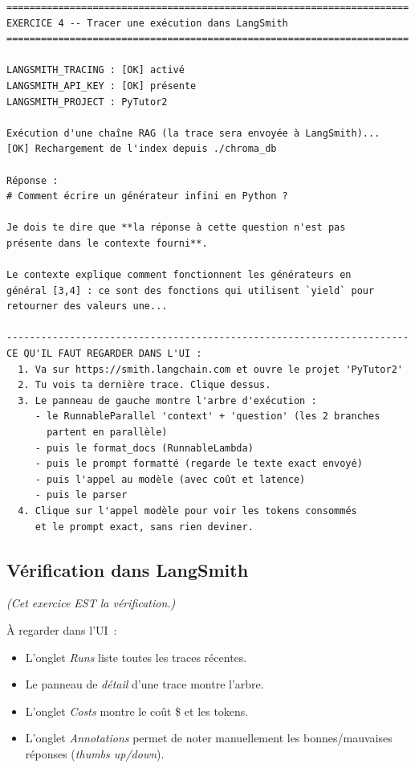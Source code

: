 \documentclass[11pt,a4paper]{article}
\begin{document}
\begin{tcolorbox}[
  colback=white,
  colframe=black!50,
  coltitle=black,
  fonttitle=\footnotesize\bfseries,
  fontupper=\footnotesize,
  title=Sortie de l'exécution,
  breakable,
]
\begin{verbatim}
======================================================================
EXERCICE 4 -- Tracer une exécution dans LangSmith
======================================================================

LANGSMITH_TRACING : [OK] activé
LANGSMITH_API_KEY : [OK] présente
LANGSMITH_PROJECT : PyTutor2

Exécution d'une chaîne RAG (la trace sera envoyée à LangSmith)...
[OK] Rechargement de l'index depuis ./chroma_db

Réponse :
# Comment écrire un générateur infini en Python ?

Je dois te dire que **la réponse à cette question n'est pas
présente dans le contexte fourni**.

Le contexte explique comment fonctionnent les générateurs en
général [3,4] : ce sont des fonctions qui utilisent `yield` pour
retourner des valeurs une...

----------------------------------------------------------------------
CE QU'IL FAUT REGARDER DANS L'UI :
  1. Va sur https://smith.langchain.com et ouvre le projet 'PyTutor2'
  2. Tu vois ta dernière trace. Clique dessus.
  3. Le panneau de gauche montre l'arbre d'exécution :
     - le RunnableParallel 'context' + 'question' (les 2 branches
       partent en parallèle)
     - puis le format_docs (RunnableLambda)
     - puis le prompt formatté (regarde le texte exact envoyé)
     - puis l'appel au modèle (avec coût et latence)
     - puis le parser
  4. Clique sur l'appel modèle pour voir les tokens consommés
     et le prompt exact, sans rien deviner.
\end{verbatim}
\end{tcolorbox}

\subsection{Vérification dans LangSmith}

\emph{(Cet exercice EST la vérification.)}

À regarder dans l'UI~:
\begin{itemize}[leftmargin=*]
  \item L'onglet \emph{Runs} liste toutes les traces récentes.
  \item Le panneau de \emph{détail} d'une trace montre l'arbre.
  \item L'onglet \emph{Costs} montre le coût \$ et les tokens.
  \item L'onglet \emph{Annotations} permet de noter manuellement
        les bonnes/mauvaises réponses (\emph{thumbs up/down}).
\end{itemize}
\end{document}
